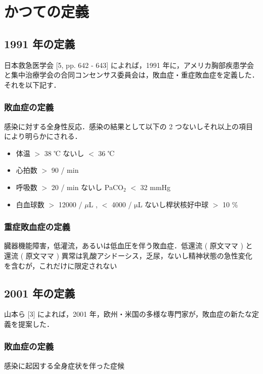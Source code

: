 \documentclass[10pt,uplatex]{jsarticle}
\begin{document}
\section{かつての定義}

\subsection{1991 年の定義}

日本救急医学会 [5, pp. 642 - 643] によれば，1991 年に，アメリカ胸部疾患学会と集中治療学会の合同コンセンサス委員会は，敗血症・重症敗血症を定義した．それを以下記す．

\subsubsection{敗血症の定義}

感染に対する全身性反応．感染の結果として以下の 2 つないしそれ以上の項目により明らかにされる．

\begin{itemize}
\item 体温 $>$ 38 ℃ ないし $<$ 36 ℃
\item 心拍数 $>$ 90 / min
\item 呼吸数 $>$ 20 / min ないし PaCO$_2$ $<$ 32 mmHg
\item 白血球数 $>$ 12000 / $\mu{}$L , $<$ 4000 / $\mathrm{\mu}$L ないし桿状核好中球 $>$ 10 \%
\end{itemize}

\subsubsection{重症敗血症の定義}

臓器機能障害，低灌流，あるいは低血圧を伴う敗血症．低還流 ( 原文ママ ) と還流 ( 原文ママ ) 異常は乳酸アシドーシス，乏尿，ないし精神状態の急性変化を含むが，これだけに限定されない

\subsection{2001 年の定義}

山本ら [3] によれば，2001 年，欧州・米国の多様な専門家が，敗血症の新たな定義を提案した．

\subsubsection{敗血症の定義}

感染に起因する全身症状を伴った症候
\end{document}
